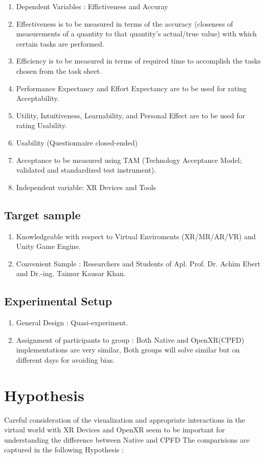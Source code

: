 \documentclass{article}
\begin{document}
\begin{enumerate}[label=\textbf{\alph*}]
	\item Dependent Variables : Effictiveness and Accuray
	\item Effectiveness is to be measured in terms of the accuracy (closeness of measurements of a quantity to that quantity’s actual/true value) with which certain tasks are performed.
	\item Efficiency is to be measured in terms of required time to accomplish the tasks chosen from the task sheet.
	\item Performance Expectancy and Effort Expectancy are to be used for rating Acceptability.
	\item Utility, Intuitiveness, Learnability, and Personal Effect are to be used for rating Usability.
	\item Usability (Questionnaire closed-ended)
	\item Acceptance to be measured using TAM (Technology Acceptance Model; validated and standardized test instrument).
	\item Independent variable: XR Devices and Tools
\end{enumerate}

\subsection{Target sample}
\begin{enumerate}[label=\textbf{\alph*}]
	\item Knowledgeable with respect to Virtual Enviroments (XR/MR/AR/VR) and Unity Game Engine.
	\item Convenient Sample : Researchers and Students of Apl. Prof. Dr. Achim Ebert and Dr.-ing. Taimur Kausar Khan.
\end{enumerate}

\subsection{Experimental Setup}
\begin{enumerate}[label=\textbf{\alph*}]
	\item General Design : Quasi-experiment.
	\item Assignment of participants to group : Both Native and OpenXR(CPFD) implementations are very similar, Both groups will solve similar but on different days for avoiding bias.
\end{enumerate}

\section{Hypothesis}
Careful consideration of the visualization and appropriate interactions in the virtaul world with XR Devices and OpenXR seem to be important for understanding the difference between Native and CPFD
The comparisions are captured in the following Hypothesis :
\end{document}
